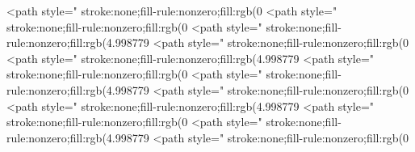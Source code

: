 <path style=" stroke:none;fill-rule:nonzero;fill:rgb(0%
<path style=" stroke:none;fill-rule:nonzero;fill:rgb(0%
<path style=" stroke:none;fill-rule:nonzero;fill:rgb(4.998779%
<path style=" stroke:none;fill-rule:nonzero;fill:rgb(0%
<path style=" stroke:none;fill-rule:nonzero;fill:rgb(4.998779%
<path style=" stroke:none;fill-rule:nonzero;fill:rgb(0%
<path style=" stroke:none;fill-rule:nonzero;fill:rgb(4.998779%
<path style=" stroke:none;fill-rule:nonzero;fill:rgb(0%
<path style=" stroke:none;fill-rule:nonzero;fill:rgb(4.998779%
<path style=" stroke:none;fill-rule:nonzero;fill:rgb(0%
<path style=" stroke:none;fill-rule:nonzero;fill:rgb(4.998779%
<path style=" stroke:none;fill-rule:nonzero;fill:rgb(0%
